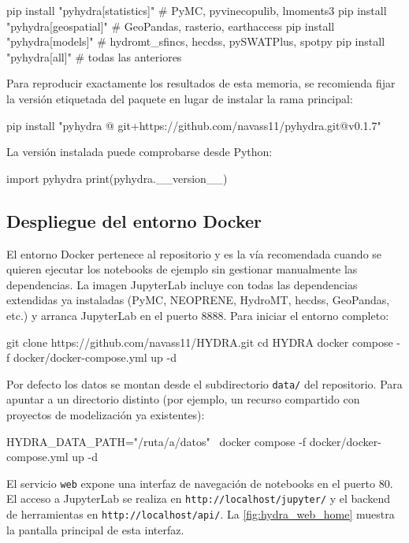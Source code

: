 \begin{codeblock}
pip install "pyhydra[statistics]"   # PyMC, pyvinecopulib, lmoments3
pip install "pyhydra[geospatial]"   # GeoPandas, rasterio, earthaccess
pip install "pyhydra[models]"       # hydromt_sfincs, hecdss, pySWATPlus, spotpy
pip install "pyhydra[all]"          # todas las anteriores
\end{codeblock}

Para reproducir exactamente los resultados de esta memoria, se recomienda fijar la versión etiquetada del paquete en lugar de instalar la rama principal:

\begin{codeblock}
pip install "pyhydra @ git+https://github.com/navass11/pyhydra.git@v0.1.7"
\end{codeblock}

La versión instalada puede comprobarse desde Python:

\begin{codeblock}
import pyhydra
print(pyhydra.__version__)
\end{codeblock}

\subsection{Despliegue del entorno Docker}

El entorno Docker pertenece al repositorio \hydra y es la vía recomendada cuando se quieren ejecutar los notebooks de ejemplo sin gestionar manualmente las dependencias. La imagen JupyterLab incluye \pyhydra con todas las dependencias extendidas ya instaladas (PyMC, NEOPRENE, HydroMT, hecdss, GeoPandas, etc.) y arranca JupyterLab en el puerto 8888. Para iniciar el entorno completo:

\begin{codeblock}
git clone https://github.com/navass11/HYDRA.git
cd HYDRA
docker compose -f docker/docker-compose.yml up -d
\end{codeblock}

Por defecto los datos se montan desde el subdirectorio \texttt{data/} del repositorio. Para apuntar a un directorio distinto (por ejemplo, un recurso compartido con proyectos de modelización ya existentes):

\begin{codeblock}
HYDRA_DATA_PATH="/ruta/a/datos" \
  docker compose -f docker/docker-compose.yml up -d
\end{codeblock}

El servicio \texttt{web} expone una interfaz de navegación de notebooks en el puerto 80. El acceso a JupyterLab se realiza en \texttt{http://localhost/jupyter/} y el backend de herramientas en \texttt{http://localhost/api/}. La \cref{fig:hydra_web_home} muestra la pantalla principal de esta interfaz.

